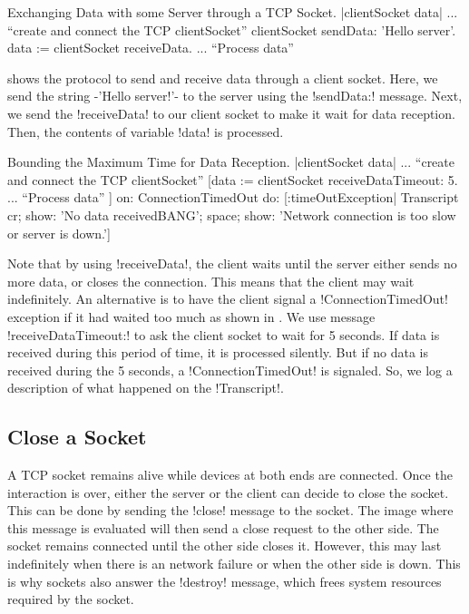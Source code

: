 \documentclass[a4paper,10pt,twoside]{book}
\begin{document}
\begin{script}[dataExhangeWithTcpSocket]{Exchanging Data with some Server through a TCP Socket.}
|clientSocket data|
... ``create and connect the TCP clientSocket''
clientSocket sendData: 'Hello server'.
data := clientSocket receiveData.
... ``Process data''
\end{script}

 shows the protocol to send and receive data through a client socket.
Here, we send the string \ct-'Hello server!'- to the server using the \ct!sendData:! message.
Next, we send the \ct!receiveData! to our client socket to make it wait for data reception.
Then, the contents of variable \ct!data! is processed.

\begin{script}[dataReceptionTimeOut]{Bounding the Maximum Time for Data Reception.}
|clientSocket data|
... ``create and connect the TCP clientSocket''
[data := clientSocket receiveDataTimeout: 5.
... ``Process data''
] on: ConnectionTimedOut 
do: [:timeOutException|
	Transcript 
		cr; 
		show: 'No data receivedBANG';
		space;
		show: 'Network connection is too slow or server is down.']
\end{script}

Note that by using  \ct!receiveData!, the client waits until the server either sends no more data, or closes the connection.
This means that the client may wait indefinitely.
An alternative is to have the client signal a \ct!ConnectionTimedOut! exception if it had waited too much as shown in .
We use message \ct!receiveDataTimeout:! to ask the client socket to wait for 5 seconds.
If data is received during this period of time, it is processed silently.
But if no data is received during the 5 seconds, a \ct!ConnectionTimedOut! is signaled.
So, we log a description of what happened on the \ct!Transcript!.

\subsection{Close a Socket}
A TCP socket remains alive while devices at both ends are connected.
Once the interaction is over, either the server or the client can decide to close the socket.
This can be done by sending the \ct!close! message to the socket.
The image where this message is evaluated will then send a close request to the other side.
The socket remains connected until the other side closes it.
However, this may last indefinitely when there is an network failure or when the other side is down.
This is why sockets also answer the \ct!destroy! message, which frees system resources required by the socket.
\end{document}
